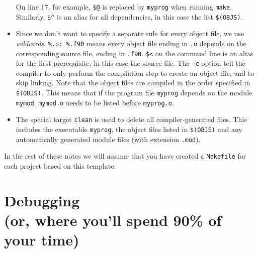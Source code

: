 \documentclass[openany,oneside]{report}
\newcommand{\Chapter}[2]{\chapter[#1]{#1\\[1ex]\Large#2}}
\begin{document}
\begin{itemize}
    On line 17, for example, \texttt{\$@} is replaced by \texttt{myprog} when running \texttt{make}.
    Similarly, \texttt{\$\^} is an alias for all dependencies, in this case the list \texttt{\$(OBJS)}.
  \item Since we don't want to specify a separate rule for every object file, we use \emph{wildcards}.
    \texttt{\%.o: \%.f90} means every object file ending in \texttt{.o} depends on the corresponding source file, ending in \texttt{.f90}.
    \texttt{\$<} on the command line is an alias for the first prerequisite, in this case the source file.
    The \texttt{-c} option tell the compiler to only perform the compilation step to create an object file, and to skip linking.
    Note that the object files are compiled in the order specified in \texttt{\$(OBJS)}.
    This means that if the program file \texttt{myprog} depends on the module \texttt{mymod}, \texttt{mymod.o} needs to be listed before \texttt{myprog.o}.
  \item The special target \texttt{clean} is used to delete all compiler-generated files.
    This includes the executable \texttt{myprog}, the object files listed in \texttt{\$(OBJS)} and any automatically generated module files (with extension \texttt{.mod}).
\end{itemize}
In the rest of these notes we will assume that you have created a \texttt{Makefile} for each project based on this template.

\Chapter{Debugging}{(or, where you'll spend 90\% of your time)}
\label{chap:Debugging}
\end{document}
